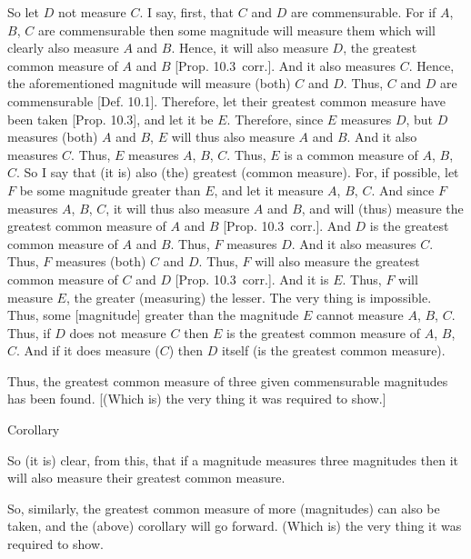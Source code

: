 \begin{Parallel}{}{}
{So let $D$ not measure $C$. I say, first, that $C$ and $D$ are
commensurable. For if $A$, $B$, $C$ are commensurable then some
magnitude will measure them which will clearly also measure $A$ and $B$.
Hence, it will also measure $D$, the greatest common measure of $A$ and $B$ [Prop. 10.3~corr.]. And it also measures
$C$. Hence, the aforementioned magnitude will measure (both)
$C$ and $D$. Thus, $C$ and $D$ are commensurable [Def. 10.1]. Therefore, let their
greatest common measure have been taken [Prop. 10.3], and let it be $E$. Therefore, since
$E$ measures $D$, but $D$ measures (both) $A$ and $B$, $E$ will
thus also measure $A$ and $B$. And it also measures $C$. Thus,
$E$ measures $A$, $B$, $C$. Thus, $E$ is a common measure of $A$, $B$, $C$.  So I say that (it is) also (the) greatest (common measure). For, if
possible, let $F$ be some magnitude greater than $E$, and let it
measure $A$, $B$, $C$. And since $F$ measures $A$, $B$, $C$, it will
thus also measure $A$ and $B$, and  will (thus) measure the greatest common measure of $A$ and $B$ [Prop. 10.3~corr.].  And
$D$ is the greatest common measure of $A$ and $B$.  Thus, $F$ measures $D$. And it also measures $C$. Thus, $F$ measures (both) $C$ and $D$.
Thus, $F$ will also measure the greatest common measure of $C$ and $D$  [Prop. 10.3~corr.].
And it is $E$. Thus, $F$ will measure $E$, the greater (measuring)
the lesser. The very thing is impossible. Thus, some [magnitude]
greater than the magnitude $E$ cannot measure $A$, $B$, $C$. Thus,
if $D$ does not
measure $C$ then
$E$ is the greatest common measure of $A$, $B$, $C$.  And if it does measure ($C$) then $D$ itself (is the
greatest common measure).

Thus, the greatest common measure  of three given
commensurable magnitudes has been found.  [(Which is) the very thing it was required to
show.]\\

\begin{center}
{\large Corollary}
\end{center}\vspace*{-7pt}

So (it is) clear, from this, that if a magnitude measures three
magnitudes then it will also measure their greatest common measure.

So, similarly, the greatest common measure of more (magnitudes) can also be
taken, and the (above) corollary will go forward. (Which is) the very thing
it was required to show.}
\end{Parallel}~\\

